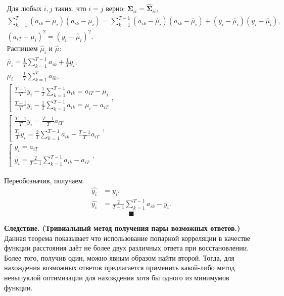 \documentclass{article}
\begin{document}
\begin{gather*}
	\text{Для любых } i, j \text{ таких, что } i = j \text{ верно: } \mathbf{\Sigma}_{ii} = \hat{\mathbf{\Sigma}}_{ii},\\
	\sum_{k=1}^{T}(a_{ik} - \mu_i)(a_{ik}-\mu_i) = \sum_{k=1}^{T-1}(a_{ik} - \hat{\mu}_i)(a_{ik}-\hat{\mu}_i) + (y_i - \hat{\mu}_i)(y_i - \hat{\mu}_i),\\
	(a_{iT}-\mu_i)^2 = (y_i-\hat{\mu}_i)^2.\\
	\text{Распишем } \hat{\mu}_i \text{ и } \hat{\mu}:\\
	\hat{\mu}_i = \frac{1}{T}\sum_{k=1}^{T-1}a_{ik} + \frac{1}{T}y_i,\\
	\mu_i = \frac{1}{T}\sum_{k=1}^{T}a_{ik},\\
	\left[
	\begin{array}{ll}
		\frac{T-1}{T}y_i-\frac{1}{T}\sum_{k=1}^{T-1}a_{ik}=a_{iT}-\mu_i
		\\[1ex]
		\frac{T-1}{T}y_i-\frac{1}{T}\sum_{k=1}^{T-1}a_{ik}=\mu_i-a_{iT}
	\end{array},
	\right .\\[1ex]
	\left[
	\begin{array}{ll}
		\frac{T-1}{T}y_i = \frac{T-1}{T}a_{iT}
		\\[1ex]
		\frac{T_1}{T}y_i = \frac{2}{T} \sum_{k=1}^{T-1} a_{ik} - \frac{T-1}{T}a_{iT}
	\end{array},
	\right .\\[1ex]
	\left[
	\begin{array}{ll}
		y_i = a_{iT}
		\\[1ex]
		y_i = \frac{2}{T-1} \sum_{k=1}^{T-1} a_{ik} - a_{iT}
	\end{array}.
	\right .
\end{gather*}

Переобозначив, получаем
\begin{align*}
	\hat{y_i} &= y_i,\\
	\hat{y_i} &= \frac{2}{T-1} \sum_{k=1}^{T-1} a_{ik} - y_i.
\end{align*}
$$ \blacksquare $$

\textbf{Следствие. (Тривиальный метод получения пары возможных ответов.)} Данная теорема показывает что использование попарной корреляции в качестве функции расстояния даёт не более двух различных ответа при восстановлении. Более того, получив один, можно явным образом найти второй. Тогда, для нахождения возможных ответов предлагается применить какой-либо метод невыпуклой оптимизации для нахождения хотя бы одного из минимумов функции.
\end{document}
